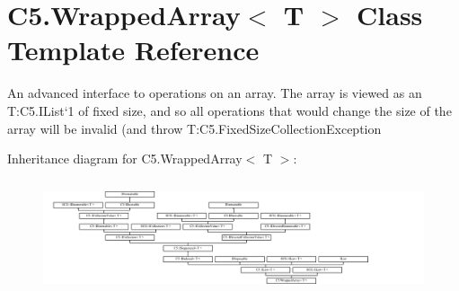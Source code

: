 \hypertarget{class_c5_1_1_wrapped_array}{}\section{C5.\+Wrapped\+Array$<$ T $>$ Class Template Reference}
\label{class_c5_1_1_wrapped_array}


An advanced interface to operations on an array. The array is viewed as an T\+:\+C5.\+I\+List`1 of fixed size, and so all operations that would change the size of the array will be invalid (and throw T\+:\+C5.\+Fixed\+Size\+Collection\+Exception  


Inheritance diagram for C5.\+Wrapped\+Array$<$ T $>$\+:\begin{figure}[H]
\begin{center}
\leavevmode
\includegraphics[height=3.380281cm]{class_c5_1_1_wrapped_array}
\end{center}
\end{figure}
